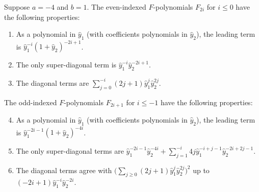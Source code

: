 \documentclass[ALCO,ThmDefs,Unicode,epreuves]{cedram}
\newcommand{\hy}{\hat{y}}
\begin{document}
\begin{lemma}\label{F coeffs asym}
Suppose $a=-4$ and $b=1$.
The even-indexed $F$-polynomials $F_{2i}$ for $i\le0$ have the following properties:
\begin{enumerate}[label=(\roman*)]%
\item \label{leading asym}
As a polynomial in $\hy_1$ (with coefficients polynomials in $\hy_2$), the leading term is $\hy_1^{-i}(1+\hy_2)^{-2i+1}$.
\item \label{super asym}
The only super-diagonal term is $\hy_1^{-i}\hy_2^{-2i+1}$.
\item \label{key terms asym}
The diagonal terms are $\sum_{j=0}^{-i}(2j+1)\hy_1^j\hy_2^{2j}$.
\end{enumerate}
The odd-indexed $F$-polynomials $F_{2i+1}$ for $i\le-1$ have the following properties:
\begin{enumerate}[label=(\roman*)] %
\setcounter{enumi}{3}
\item \label{leading asym odd}
As a polynomial in $\hy_1$ (with coefficients polynomials in $\hy_2$), the leading term is $\hy_1^{-2i-1}(1+\hy_2)^{-4i}$.
\item \label{super asym odd}
The only super-diagonal terms are $\hy_1^{-2i-1}\hy_2^{-4i}+\sum_{j=1}^{-i}4j\hy_1^{-i+j-1}\hy_2^{-2i+2j-1}$.
\item \label{key terms asym odd}
The diagonal terms agree with $\bigl(\sum_{j\ge0}(2j+1)\hy_1^j\hy_2^{2j}\bigr)^2$ up to $(-2i+1)\hy_1^{-i}\hy_2^{-2i}$.
\end{enumerate}
\end{lemma}
\end{document}
